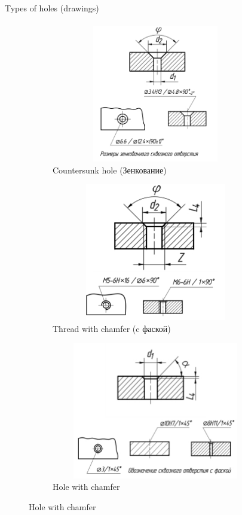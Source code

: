 \documentclass[aspectratio=169]{beamer}
\begin{document}
\begin{frame}[t]{Types of holes (drawings)}
    \framesubtitle{}
    \vspace{-0.6cm}
    \begin{figure}[H]
        \begin{subfigure}{0.32\textwidth}
            \centering\includegraphics[height=6cm,width=1\textwidth,keepaspectratio]{countersunk_hole_drawing.png}
            \caption*{Countersunk hole (Зенкование)}
            \label{fig:countersunk_hole_drawing.png}
        \end{subfigure}
        \begin{subfigure}{0.32\textwidth}
            \centering\includegraphics[height=6cm,width=1\textwidth,keepaspectratio]{thread_with_chamfer.png}
            \caption*{Thread with chamfer (c фаской)}
            \label{fig:thread_with_chamfer.png}
        \end{subfigure}
        \begin{subfigure}{0.32\textwidth}
            \centering\includegraphics[height=6cm,width=1\textwidth,keepaspectratio]{hole_with_champfer.png}
            \caption*{Hole with chamfer}
            \label{fig:hole_with_champfer.png}
        \end{subfigure}
    \end{figure}
\end{frame}
\end{document}
